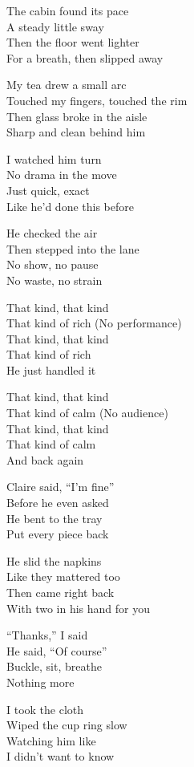 \begin{lyrics}
The cabin found its pace\\
A steady little sway\\
Then the floor went lighter\\
For a breath, then slipped away

My tea drew a small arc\\
Touched my fingers, touched the rim\\
Then glass broke in the aisle\\
Sharp and clean behind him

I watched him turn\\
No drama in the move\\
Just quick, exact\\
Like he’d done this before

He checked the air\\
Then stepped into the lane\\
No show, no pause\\
No waste, no strain

That kind, that kind\\
That kind of rich
(No performance)\\
That kind, that kind\\
That kind of rich\\
He just handled it

That kind, that kind\\
That kind of calm
(No audience)\\
That kind, that kind\\
That kind of calm\\
And back again

Claire said, “I’m fine”\\
Before he even asked\\
He bent to the tray\\
Put every piece back

He slid the napkins\\
Like they mattered too\\
Then came right back\\
With two in his hand for you

“Thanks,” I said\\
He said, “Of course”\\
Buckle, sit, breathe\\
Nothing more

I took the cloth\\
Wiped the cup ring slow\\
Watching him like\\
I didn’t want to know


\end{lyrics}
